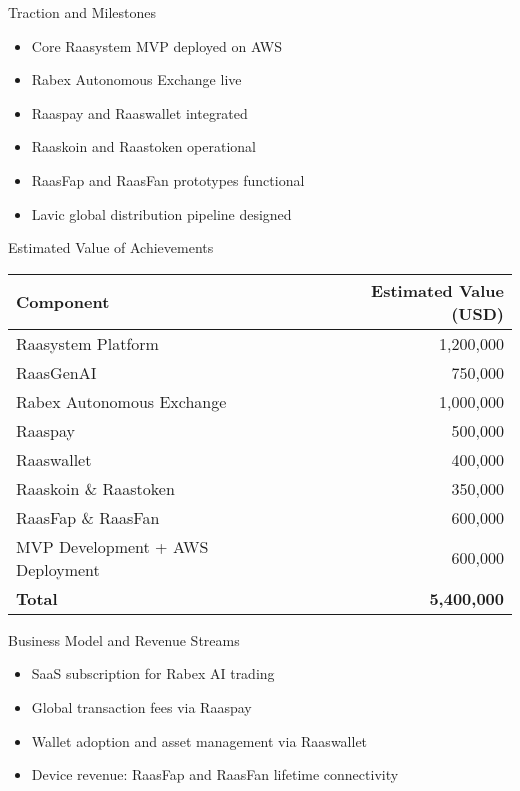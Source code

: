 \documentclass{beamer}
\begin{document}
\begin{frame}{Traction and Milestones}
\begin{itemize}
    \item Core Raasystem MVP deployed on AWS
    \item Rabex Autonomous Exchange live
    \item Raaspay and Raaswallet integrated
    \item Raaskoin and Raastoken operational
    \item RaasFap and RaasFan prototypes functional
    \item Lavic global distribution pipeline designed
\end{itemize}
\end{frame}

\begin{frame}{Estimated Value of Achievements}
\begin{tabular}{@{}l r@{}}
\toprule
Component & Estimated Value (USD) \\
\midrule
Raasystem Platform & 1,200,000 \\
RaasGenAI & 750,000 \\
Rabex Autonomous Exchange & 1,000,000 \\
Raaspay & 500,000 \\
Raaswallet & 400,000 \\
Raaskoin \& Raastoken & 350,000 \\
RaasFap \& RaasFan & 600,000 \\
MVP Development + AWS Deployment & 600,000 \\
\midrule
\textbf{Total} & \textbf{5,400,000} \\
\bottomrule
\end{tabular}
\end{frame}

\begin{frame}{Business Model and Revenue Streams}
\begin{itemize}
    \item SaaS subscription for Rabex AI trading
    \item Global transaction fees via Raaspay
    \item Wallet adoption and asset management via Raaswallet
    \item Device revenue: RaasFap and RaasFan lifetime connectivity
\end{itemize}
\end{frame}
\end{document}
